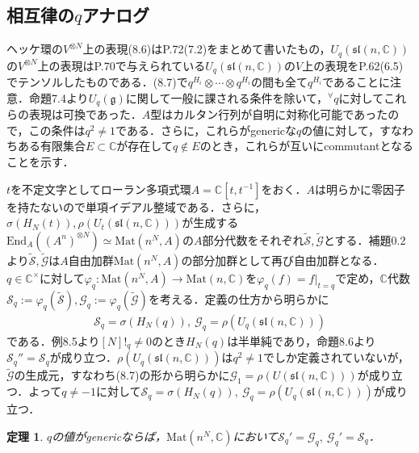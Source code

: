 \documentclass[dvipdfmx]{jsarticle}
\newtheorem{theorem}{定理}[section]%
\begin{document}
\subsection*{相互律の$q$アナログ}
ヘッケ環の$V^{\otimes N}$上の表現(8.6)はP.72(7.2)をまとめて書いたもの，$U_q(\mathfrak{sl}(n,\mathbb{C}))$の$V^{\otimes N}$上の表現はP.70で与えられている$U_q(\mathfrak{sl}(n,\mathbb{C}))$の$V$上の表現をP.62(6.5)でテンソルしたものである．(8.7)で$q^{H_i}\otimes\cdots\otimes q^{H_i}$の間も全て$q^{H_i}$であることに注意．命題7.4より$U_q(\mathfrak{g})$に関して一般に課される条件を除いて，$^\forall q$に対してこれらの表現は可換であった．$A$型はカルタン行列が自明に対称化可能であったので，この条件は$q^2\neq 1$である．さらに，これらがgenericな$q$の値に対して，すなわちある有限集合$E\subset\mathbb{C}$が存在して$q\notin E$のとき，これらが互いにcommutantとなることを示す．\par
$t$を不定文字としてローラン多項式環$A=\mathbb{C}[t,t^{-1}]$をおく．$A$は明らかに零因子を持たないので単項イデアル整域である．さらに，$\sigma(H_N(t)),\rho(U_t(\mathfrak{sl}(n,\mathbb{C})))$が生成する$\mathrm{End}_A((A^n)^{\otimes N})\simeq \mathrm{Mat}(n^N,A)$の$A$部分代数をそれぞれ$\widetilde{\mathscr{S}},\widetilde{\mathscr{G}}$とする．補題0.2より$\widetilde{\mathscr{S}},\widetilde{\mathscr{G}}$は$A$自由加群$\mathrm{Mat}(n^N,A)$の部分加群として再び自由加群となる．$q\in\mathbb{C}^\times$に対して$\varphi_q:\mathrm{Mat}(n^N,A)\to \mathrm{Mat}(n,\mathbb{C})$を$\varphi_q(f)=f|_{t=q}$で定め，$\mathbb{C}$代数$\mathscr{S}_q:=\varphi_q(\widetilde{\mathscr{S}}),\mathscr{G}_q:=\varphi_q(\widetilde{\mathscr{G}})$を考える．定義の仕方から明らかに
\begin{align*}
\mathscr{S}_q=\sigma(H_N(q)),{\ }\mathscr{G}_q=\rho(U_q(\mathfrak{sl}(n,\mathbb{C})))
\end{align*}
である．例8.5より$[N]!_q\neq 0$のとき$H_N(q)$は半単純であり，命題8.6より$\mathscr{S}_q''=\mathscr{S}_q$が成り立つ．$\rho(U_q(\mathfrak{sl}(n,\mathbb{C})))$は$q^2\neq 1$でしか定義されていないが，$\widetilde{\mathscr{G}}$の生成元，すなわち(8.7)の形から明らかに$\mathscr{G}_1=\rho(U(\mathfrak{sl}(n,\mathbb{C})))$が成り立つ．よって$q\neq -1$に対して$\mathscr{S}_q=\sigma(H_N(q)),{\ }\mathscr{G}_q=\rho(U_q(\mathfrak{sl}(n,\mathbb{C})))$が成り立つ．
%
%
%
%
\setcounter{theorem}{9}
\begin{theorem}
$q$の値がgenericならば，$\mathrm{Mat}(n^N,\mathbb{C})$において$\mathscr{S}_q'=\mathscr{G}_q,{\ }\mathscr{G}_q'=\mathscr{S}_q$．
\end{theorem}
\end{document}
